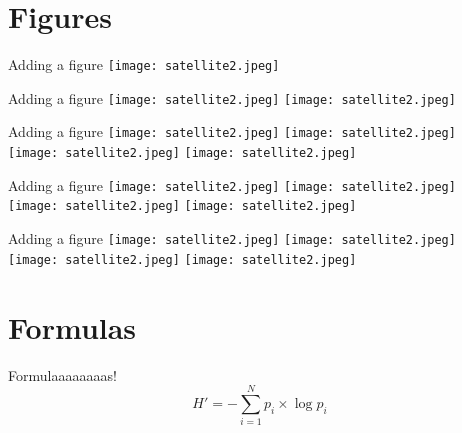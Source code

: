 \section{Figures}
\begin{frame}{Adding a figure}
\centering
 \texttt{[image: satellite2.jpeg]}
\end{frame}

\begin{frame}{Adding a figure}
\centering
 \texttt{[image: satellite2.jpeg]}
 \texttt{[image: satellite2.jpeg]}
\end{frame}

\begin{frame}{Adding a figure}
\centering
 \texttt{[image: satellite2.jpeg]}
 \texttt{[image: satellite2.jpeg]}\\
 \texttt{[image: satellite2.jpeg]}
  \texttt{[image: satellite2.jpeg]}\\
\end{frame}

\begin{frame}{Adding a figure}
\centering
 \texttt{[image: satellite2.jpeg]}
 \texttt{[image: satellite2.jpeg]}\\
 \bigskip
 \texttt{[image: satellite2.jpeg]}
  \texttt{[image: satellite2.jpeg]}\\
\end{frame}


\begin{frame}{Adding a figure}
\centering
 \texttt{[image: satellite2.jpeg]}
 \texttt{[image: satellite2.jpeg]}\\
 \smallskip
 \texttt{[image: satellite2.jpeg]}
  \texttt{[image: satellite2.jpeg]}\\
\end{frame}

\section{Formulas}


\begin{frame}{Formulaaaaaaaas!}
    \begin{equation}
        H' = - \sum_{i=1}^{N} p_i \times \log{p_i}
    \end{equation}
\end{frame}

